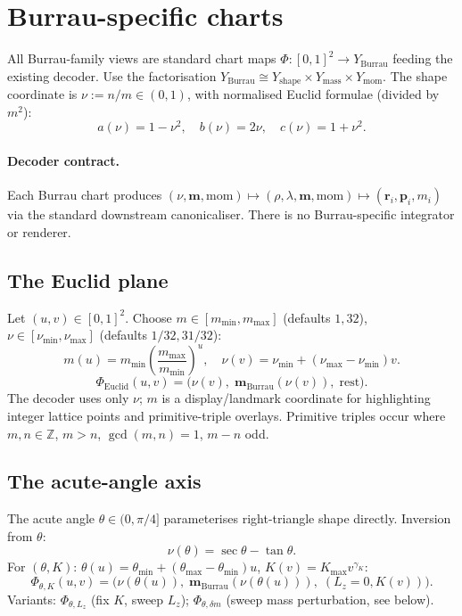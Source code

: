 \documentclass[11pt]{report}
\def\boldsymbol#1{#1}%
\begin{document}
\section{Burrau-specific charts}
\label{sec:burrau_charts}

All Burrau-family views are standard chart maps $\Phi:[0,1]^2\to Y_{\mathrm{Burrau}}$ feeding the existing decoder. Use the factorisation $Y_{\mathrm{Burrau}}\cong Y_{\mathrm{shape}}\times Y_{\mathrm{mass}}\times Y_{\mathrm{mom}}$. The shape coordinate is $\nu:=n/m\in(0,1)$, with normalised Euclid formulae (divided by $m^2$):
\[
a(\nu)=1-\nu^2,\quad b(\nu)=2\nu,\quad c(\nu)=1+\nu^2.
\]

\paragraph{Decoder contract.} Each Burrau chart produces $(\nu,\mathbf m,\mathrm{mom})\mapsto(\boldsymbol\rho,\boldsymbol\lambda,\mathbf m,\mathrm{mom})\mapsto(\mathbf r_i,\mathbf p_i,m_i)$ via the standard downstream canonicaliser. There is no Burrau-specific integrator or renderer.

\subsection{The Euclid plane}

Let $(u,v)\in[0,1]^2$. Choose $m\in[m_{\min},m_{\max}]$ (defaults $1,32$), $\nu\in[\nu_{\min},\nu_{\max}]$ (defaults $1/32,31/32$):
\[
m(u)=m_{\min}\left(\frac{m_{\max}}{m_{\min}}\right)^u,\quad \nu(v)=\nu_{\min}+(\nu_{\max}-\nu_{\min})v.
\]
\[
\boxed{\Phi_{\mathrm{Euclid}}(u,v)=\big(\nu(v),\;\mathbf m_{\mathrm{Burrau}}(\nu(v)),\;\mathrm{rest}\big).}
\]
The decoder uses only $\nu$; $m$ is a display/landmark coordinate for highlighting integer lattice points and primitive-triple overlays. Primitive triples occur where $m,n\in\mathbb Z$, $m>n$, $\gcd(m,n)=1$, $m-n$ odd.

\subsection{The acute-angle axis}

The acute angle $\theta\in(0,\pi/4]$ parameterises right-triangle shape directly. Inversion from $\theta$:
\[
\nu(\theta) = \sec\theta-\tan\theta.
\]
For $(\theta,K)$: $\theta(u)=\theta_{\min}+(\theta_{\max}-\theta_{\min})u$, $K(v)=K_{\max}v^{\gamma_K}$:
\[
\boxed{\Phi_{\theta,K}(u,v)=\big(\nu(\theta(u)),\;\mathbf m_{\mathrm{Burrau}}(\nu(\theta(u))),\;(L_z{=}0,K(v))\big).}
\]
Variants: $\Phi_{\theta,L_z}$ (fix $K$, sweep $L_z$); $\Phi_{\theta,\delta m}$ (sweep mass perturbation, see below).
\end{document}

